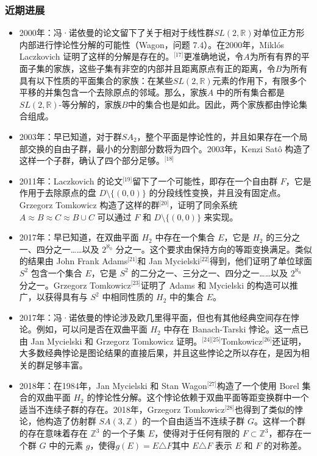 \subsubsection{近期进展}  
\begin{itemize}
\item 2000年：冯·诺依曼的论文留下了关于相对于线性群\( SL(2, \mathbb{R}) \)对单位正方形内部进行悖论性分解的可能性（Wagon，问题 7.4）。在2000年，Miklós Laczkovich 证明了这样的分解是存在的。\(^\text{[17]}\)更准确地说，令\( A \)为所有有界的平面子集的家族，这些子集有非空的内部并且距离原点有正的距离，令\( B \)为所有具有以下性质的平面集合的家族：在某些\( SL(2, \mathbb{R}) \)元素的作用下，有限多个平移的并集包含一个去除原点的邻域。那么，家族\( A \) 中的所有集合都是\( SL(2, \mathbb{R}) \)-等分解的，家族\( B \)中的集合也是如此。因此，两个家族都由悖论集合组成。
\item 2003年：早已知道，对于群\( SA_2 \)，整个平面是悖论性的，并且如果存在一个局部交换的自由子群，最小的分割部分数将为四个。2003年，Kenzi Satô 构造了这样一个子群，确认了四个部分足够。\(^\text{[18]}\)
\item 2011年：Laczkovich 的论文\(^\text{[19]}\)留下了一个可能性，即存在一个自由群 \( F \)，它是作用于去除原点的盘 \( D \setminus \{(0,0)\} \) 的分段线性变换，并且没有固定点。Grzegorz Tomkowicz 构造了这样的群\(^\text{[20]}\)，证明了同余系统 \( A \approx B \approx C \approx B \cup C \) 可以通过 \( F \) 和 \( D \setminus \{(0,0)\} \) 来实现。
\item 2017年：早已知道，在双曲平面 \( H_2 \) 中存在一个集合 \( E \)，它是 \( H_2 \) 的三分之一、四分之一……以及 \( 2^{\aleph_0} \) 分之一。这个要求由保持方向的等距变换满足。类似的结果由 John Frank Adams\(^\text{[21]}\)和 Jan Mycielski\(^\text{[22]}\)得到，他们证明了单位球面 \( S^2 \) 包含一个集合 \( E \)，它是 \( S^2 \) 的二分之一、三分之一、四分之一……以及 \( 2^{\aleph_0} \) 分之一。Grzegorz Tomkowicz\(^\text{[23]}\)证明了 Adams 和 Mycielski 的构造可以推广，以获得具有与 \( S^2 \) 中相同性质的 \( H_2 \) 中的集合 \( E \)。
\item 2017年：冯·诺依曼的悖论涉及欧几里得平面，但也有其他经典空间存在悖论。例如，可以问是否在双曲平面 \( H_2 \) 中存在 Banach-Tarski 悖论。这一点已由 Jan Mycielski 和 Grzegorz Tomkowicz 证明。\(^\text{[24][25]}\)Tomkowicz\(^\text{[26]}\)还证明，大多数经典悖论是图论结果的直接后果，并且这些悖论之所以存在，是因为相关的群足够丰富。
\item 2018年：在1984年，Jan Mycielski 和 Stan Wagon\(^\text{[27]}\)构造了一个使用 Borel 集合的双曲平面 \( H_2 \) 的悖论性分解。这个悖论依赖于双曲平面等距变换群中一个适当不连续子群的存在。2018年，Grzegorz Tomkowicz\(^\text{[28]}\)也得到了类似的悖论，他构造了仿射群 \( SA(3, \mathbb{Z}) \) 的一个自由适当不连续子群 \( G \)。这样一个群的存在意味着存在 \( \mathbb{Z}^3 \) 的一个子集 \( E \)，使得对于任何有限的 \( F \subset \mathbb{Z}^3 \)，都存在一个群 \( G \) 中的元素 \( g \)，使得\(g(E) = E \triangle F\)其中 \( E \triangle F \) 表示 \( E \) 和 \( F \) 的对称差。

\end{itemize}

